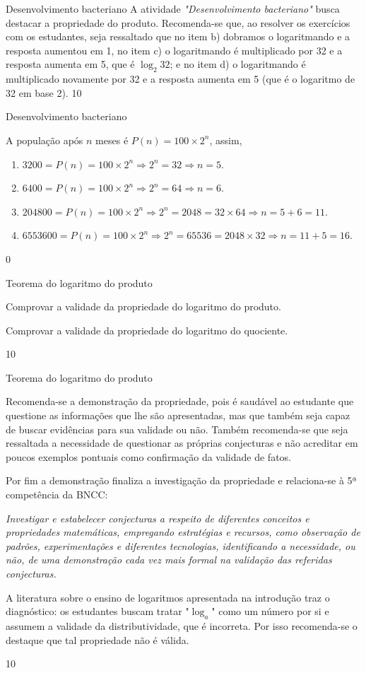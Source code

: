 \clearmargin
\begin{sugestions}{Desenvolvimento bacteriano}
{
	A atividade \textit{"Desenvolvimento bacteriano"} busca destacar a propriedade do produto. Recomenda-se que, ao resolver os exercícios com os estudantes, seja ressaltado que no item b) dobramos o logaritmando e a resposta aumentou em 1, no item c) o logaritmando é multiplicado por 32 e a resposta aumenta em 5, que é $\log_2 32$; e no item d) o logaritmando é multiplicado novamente por 32 e a resposta aumenta em 5 (que é o logaritmo de 32 em base 2).
}{1}{0}
\end{sugestions}
\begin{answer}{Desenvolvimento bacteriano}
{
	A população após $n$ meses é $P(n) = 100 \times 2^n$, assim,
	\begin{enumerate}[label = \alph*)]
	\item $3200 = P(n) = 100 \times 2^n \Rightarrow 2^n = 32 \Rightarrow n=5$.
	\item $6400 = P(n) = 100 \times 2^n \Rightarrow 2^n = 64 \Rightarrow n=6$.
	\item $204800 = P(n) = 100 \times 2^n \Rightarrow 2^n = 2048 = 32 \times 64 \Rightarrow n=5+6=11$.
	\item $6553600 = P(n) = 100 \times 2^n \Rightarrow 2^n = 65536 = 2048 \times 32 \Rightarrow n=11+5=16$.
	\end{enumerate}
}{0}
\end{answer}
\def\currentcolor{session4}
\begin{objectives}{Teorema do logaritmo do produto}
{
	Comprovar a validade da propriedade do logaritmo do produto.

	Comprovar a validade da propriedade do logaritmo do quociente.
}{1}{0}
\end{objectives}
\begin{sugestions}{Teorema do logaritmo do produto}
{
	Recomenda-se a demonstração da propriedade, pois é saudável ao estudante que questione as informações que lhe são apresentadas, mas que também seja capaz de buscar evidências para sua validade ou não. Também recomenda-se que seja ressaltada a necessidade de questionar as próprias conjecturas e não acreditar em poucos exemplos pontuais como confirmação da validade de fatos.

	Por fim a demonstração finaliza a investigação da propriedade e relaciona-se à 5ª competência da BNCC:

	\textit{Investigar e estabelecer conjecturas a respeito de diferentes conceitos e propriedades matemáticas, empregando estratégias e recursos, como observação de padrões, experimentações e diferentes tecnologias, identificando a necessidade, ou não, de uma demonstração cada vez mais formal na validação das referidas conjecturas.}

	A literatura sobre o ensino de logaritmos apresentada na introdução traz o diagnóstico: os estudantes buscam tratar "$\log_a$" como um número por si e assumem a validade da distributividade, que é incorreta. Por isso recomenda-se o destaque que tal propriedade não é válida.
}{1}{0}
\end{sugestions}
